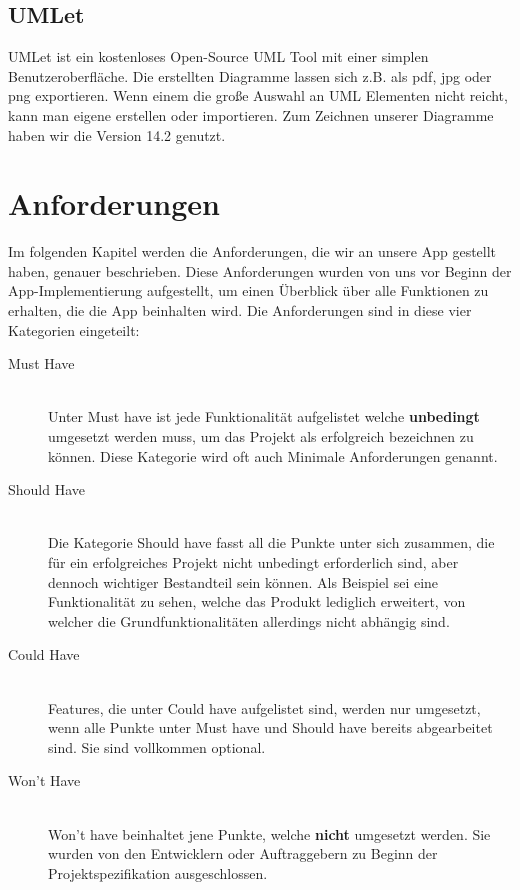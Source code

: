 \subsection{UMLet}

UMLet ist ein kostenloses Open-Source UML Tool mit einer simplen Benutzeroberfläche. Die erstellten Diagramme lassen sich z.B. als pdf, jpg oder png exportieren. Wenn einem die große Auswahl an UML Elementen nicht reicht, kann man eigene erstellen oder importieren. Zum Zeichnen unserer Diagramme haben wir die Version 14.2 genutzt. %

\newpage
\section{Anforderungen}
Im folgenden Kapitel werden die Anforderungen, die wir an unsere App gestellt haben, genauer beschrieben. Diese Anforderungen wurden von uns vor Beginn der App-Implementierung aufgestellt, um einen Überblick über alle Funktionen zu erhalten, die die App beinhalten wird. Die Anforderungen sind in diese vier Kategorien eingeteilt:
\begin{description}
\item[Must Have]\hfill \\
Unter \grqq Must have\grqq{} ist jede Funktionalität aufgelistet welche \textbf{unbedingt} umgesetzt werden muss, um das Projekt als erfolgreich bezeichnen zu können. Diese Kategorie wird oft auch \grqq Minimale Anforderungen\grqq{} genannt.
\item[Should Have]\hfill \\
Die Kategorie \grqq Should have\grqq{} fasst all die Punkte unter sich zusammen, die für ein erfolgreiches Projekt nicht unbedingt erforderlich sind, aber dennoch wichtiger Bestandteil sein können. Als Beispiel sei eine Funktionalität zu sehen, welche das Produkt lediglich erweitert, von welcher die Grundfunktionalitäten allerdings nicht abhängig sind.
\item [Could Have]\hfill \\
Features, die unter \grqq Could have\grqq{} aufgelistet sind, werden nur umgesetzt, wenn alle Punkte unter \grqq Must have\grqq{} und \grqq Should have\grqq{} bereits abgearbeitet sind. Sie sind vollkommen optional.
\item[Won't Have]\hfill \\
\grqq Won't have\grqq{} beinhaltet jene Punkte, welche \textbf{nicht} umgesetzt werden. Sie wurden von den Entwicklern oder Auftraggebern zu Beginn der Projektspezifikation ausgeschlossen.
\end{description}

